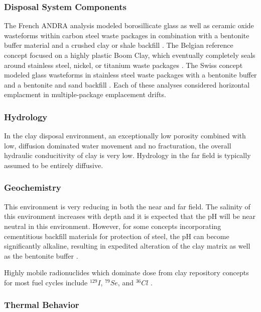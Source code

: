 

\subsubsection{Disposal System Components}

The French \gls{ANDRA}  analysis modeled borosillicate glass as well as ceramic 
oxide wasteforms within carbon steel waste packages in combination with a bentonite 
buffer material and a crushed clay or shale backfill \cite{andra_argile:_2005}.
The Belgian reference concept focused on a highly plastic Boom Clay, which 
eventually completely seals around stainless steel, nickel, or titanium waste 
packages \cite{ondraf-niras_technical_2001}.  The Swiss concept modeled glass 
wasteforms in stainless steel waste packages with a bentonite buffer and a 
bentonite and sand backfill
\cite{johnson_calculations_2002}. Each of these analyses considered 
horizontal emplacment in multiple-package emplacement drifts. 


\subsubsection{Hydrology}

In the clay disposal environment, an exceptionally low porosity combined with 
low, diffusion dominated water movement and no fracturation, the overall 
hydraulic conducitivity of clay is very low. Hydrology in the far field is 
typically assumed to be entirely diffusive.

\subsubsection{Geochemistry}

This environment is very reducing in both the near and far field.
The salinity of this environment increases with depth and it is 
expected that the pH will be near neutral in this environment. However, for 
some concepts incorporating cementitious backfill materials for protection 
of steel, the pH can become significantly alkaline, resulting in 
expedited alteration of the clay matrix as well as the bentonite buffer 
\cite{andra_argile:_2005}.

Highly mobile radionuclides which dominate dose from clay repository concepts 
for most fuel cycles include $^{129}I$, $^{79}Se$, and $^{36}Cl$ 
\cite{swift_applying_2010}.

\subsubsection{Thermal Behavior}
\label{subsec:claythermal}

